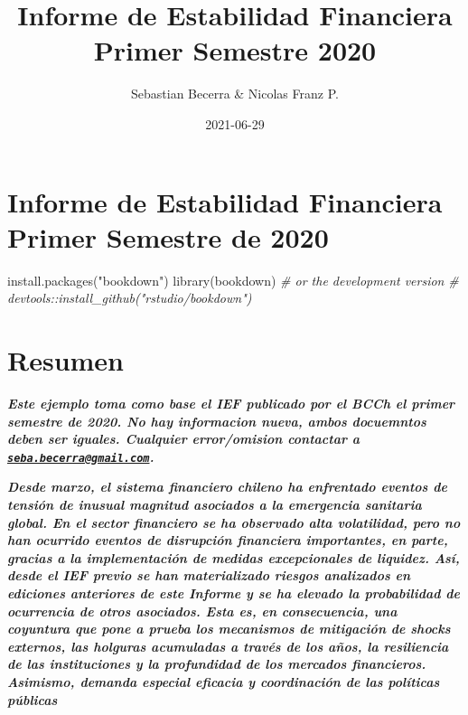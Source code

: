 \documentclass[
]{book}
\title{Informe de Estabilidad Financiera Primer Semestre 2020}
\author{Sebastian Becerra \& Nicolas Franz P.}
\date{2021-06-29}
\newenvironment{Shaded}{\begin{snugshade}}{\end{snugshade}}
\newcommand{\CommentTok}[1]{\textcolor[rgb]{0.56,0.35,0.01}{\textit{#1}}}
\newcommand{\FunctionTok}[1]{\textcolor[rgb]{0.00,0.00,0.00}{#1}}
\newcommand{\NormalTok}[1]{#1}
\newcommand{\StringTok}[1]{\textcolor[rgb]{0.31,0.60,0.02}{#1}}
\begin{document}
\maketitle

{
\setcounter{tocdepth}{1}
\tableofcontents
}
\hypertarget{informe-de-estabilidad-financiera-primer-semestre-de-2020}{%
\chapter{\texorpdfstring{\textbf{Informe de Estabilidad Financiera Primer Semestre de 2020}}{Informe de Estabilidad Financiera Primer Semestre de 2020}}\label{informe-de-estabilidad-financiera-primer-semestre-de-2020}}

\begin{Shaded}
\begin{Highlighting}[]
\FunctionTok{install.packages}\NormalTok{(}\StringTok{"bookdown"}\NormalTok{)}
\FunctionTok{library}\NormalTok{(}\StringTok{\textquotesingle{}bookdown\textquotesingle{}}\NormalTok{)}
\CommentTok{\# or the development version}
\CommentTok{\# devtools::install\_github("rstudio/bookdown")}
\end{Highlighting}
\end{Shaded}

\hypertarget{Resumen}{%
\chapter*{Resumen}\label{Resumen}}

\textbf{\emph{Este ejemplo toma como base el IEF publicado por el BCCh el primer semestre de 2020. No hay informacion nueva, ambos docuemntos deben ser iguales. Cualquier error/omision contactar a \href{mailto:seba.becerra@gmail.com}{\nolinkurl{seba.becerra@gmail.com}}.}}

\textbf{\emph{Desde marzo, el sistema financiero chileno ha enfrentado eventos de tensión
de inusual magnitud asociados a la emergencia sanitaria global. En el sector
financiero se ha observado alta volatilidad, pero no han ocurrido eventos de
disrupción financiera importantes, en parte, gracias a la implementación de
medidas excepcionales de liquidez. Así, desde el IEF previo se han materializado
riesgos analizados en ediciones anteriores de este Informe y se ha elevado
la probabilidad de ocurrencia de otros asociados. Esta es, en consecuencia,
una coyuntura que pone a prueba los mecanismos de mitigación de shocks
externos, las holguras acumuladas a través de los años, la resiliencia de las
instituciones y la profundidad de los mercados financieros. Asimismo, demanda
especial eficacia y coordinación de las políticas públicas}}
\end{document}
